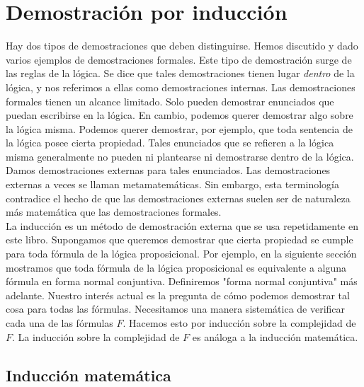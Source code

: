 \message{ !name(main.tex)}\documentclass[12pt,a4paper]{book}
\newcommand{\comillas}[1]{"#1"}
\begin{document}
    \section{Demostración por inducción}

    Hay dos tipos de demostraciones que deben distinguirse. Hemos discutido y dado varios ejemplos de demostraciones formales.
    Este tipo de demostración surge de las reglas de la lógica. Se dice que tales demostraciones tienen lugar \textit{dentro} de
    la lógica, y nos referimos a ellas como demostraciones internas. Las demostraciones formales tienen un alcance limitado.
    Solo pueden demostrar enunciados que puedan escribirse en la lógica. En cambio, podemos querer demostrar algo sobre la
    lógica misma. Podemos querer demostrar, por ejemplo, que toda sentencia de la lógica posee cierta propiedad. Tales
    enunciados que se refieren a la lógica misma generalmente no pueden ni plantearse ni demostrarse dentro de la lógica. Damos
    demostraciones externas para tales enunciados. Las demostraciones externas a veces se llaman metamatemáticas. Sin embargo,
    esta terminología contradice el hecho de que las demostraciones externas suelen ser de naturaleza más matemática que las
    demostraciones formales.\\
    La inducción es un método de demostración externa que se usa repetidamente en este libro. Supongamos que queremos demostrar
    que cierta propiedad se cumple para toda fórmula de la lógica proposicional. Por ejemplo, en la siguiente sección mostramos
    que toda fórmula de la lógica proposicional es equivalente a alguna fórmula en forma normal conjuntiva. Definiremos
    \comillas{forma normal conjuntiva} más adelante. Nuestro interés actual es la pregunta de cómo podemos demostrar tal cosa
    para todas las fórmulas. Necesitamos una manera sistemática de verificar cada una de las fórmulas $F$. Hacemos esto por
    inducción sobre la complejidad de $F$. La inducción sobre la complejidad de $F$ es análoga a la inducción matemática.

    \subsection{Inducción matemática}
\end{document}
